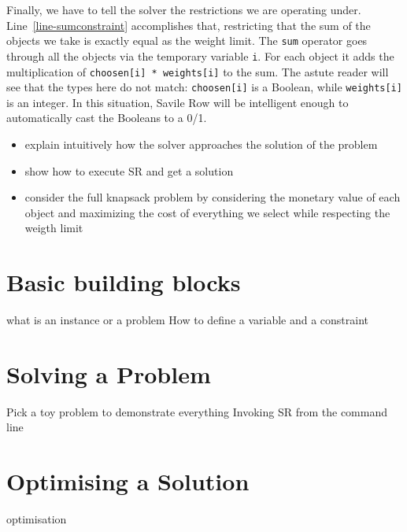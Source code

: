 Finally, we have to tell the solver the restrictions we are operating under.
Line~\ref{line-sumconstraint} accomplishes that, restricting that the sum of
the objects we take is exactly equal as the weight limit.
The \texttt{sum} operator goes through all the objects via the temporary
variable \texttt{i}. For each object it adds the multiplication of
\texttt{choosen[i] * weights[i]} to the sum. The astute reader will see that
the types here do not match: \texttt{choosen[i]} is a Boolean, while
\texttt{weights[i]} is an integer. In this situation, Savile Row will be
intelligent enough to automatically cast the Booleans to a 0/1.


\begin{itemize}
\item explain intuitively how the solver approaches the solution of the problem
\item show how to execute SR and get a solution
\item consider the full knapsack problem by considering the monetary value of each object
and maximizing the cost of everything we select while respecting the weigth limit
\end{itemize}

\section{Basic building blocks}
 what is an instance or a problem
How to define a variable and a constraint

\section{Solving a Problem}
Pick a toy problem to demonstrate everything
Invoking SR from the command line

\section{Optimising a Solution}
optimisation



